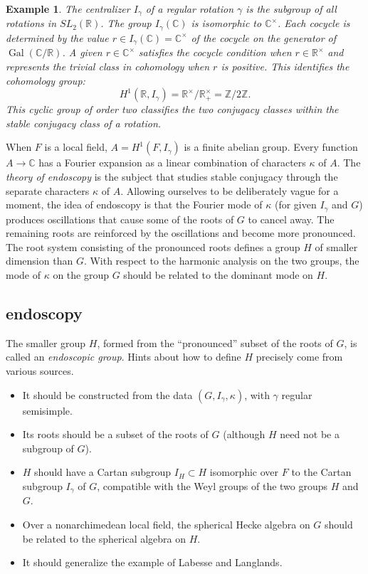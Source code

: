 \documentclass[brochure,english,12pt]{bourbaki}
\theoremstyle{plain}
\newtheorem{example}[equation]{Example}
\def\op#1{{\operatorname{#1}}}
\newcommand{\ring}[1]{\mathbb{#1}}
\begin{document}
\begin{example} The centralizer $I_\gamma$ of a regular rotation
  $\gamma$ is the subgroup of all rotations in $SL_2(\ring{R})$.  The
  group $I_\gamma(\ring{C})$ is isomorphic to $\ring{C}^\times$.  Each
  cocycle is determined by the value $r\in
  I_\gamma(\ring{C})=\ring{C}^\times$ of the cocycle on the generator of
  $\op{Gal}(\ring{C}/\ring{R})$.  A given $r\in\ring{C}^\times$
  satisfies the cocycle condition when $r\in \ring{R}^\times$ and
  represents the trivial class in cohomology when $r$ is positive.
  This identifies the cohomology group:
\[
H^1(\ring{R},I_\gamma) = \ring{R}^\times/\ring{R}^\times_+ = \ring{Z}/2\ring{Z}.
\]
This cyclic group of order two classifies the two conjugacy classes
within the stable conjugacy class of a rotation.
\end{example}

When $F$ is a local field, $A=H^1(F,I_\gamma)$ is a
finite abelian group.  Every function $A\to\ring{C}$  has a
Fourier expansion as a linear combination of characters $\kappa$ of
$A$.  
The {\it theory of endoscopy} is the subject that studies stable
conjugacy through the separate characters $\kappa$ of $A$.  Allowing
ourselves to be deliberately vague for a moment, the idea of endoscopy
is that the Fourier mode of $\kappa$ (for given $I_\gamma$ and $G$)
produces oscillations that cause some of the roots of $G$ to cancel
away.  The remaining roots are reinforced by the oscillations and
become more pronounced.  The root system consisting of the pronounced
roots defines a group $H$ of smaller dimension than $G$.  With respect
to the harmonic analysis on the two groups, the mode of $\kappa$ on
the group $G$ should be related to the dominant mode on $H$.




\subsection{endoscopy}\label{sec:endoscopy}

The smaller group $H$, formed from the ``pronounced'' subset of the
roots of $G$, is called an {\it endoscopic group}.  Hints about how to
define $H$ precisely come from various sources.
\begin{itemize}
\item It should be constructed from the data $(G,I_\gamma,\kappa)$, with $\gamma$ regular semisimple.
\item Its roots should be a subset of the roots of $G$ (although $H$ need not
be a subgroup of $G$).
\item $H$ should have a Cartan subgroup $I_H\subset H$ isomorphic over $F$ to the Cartan subgroup
$I_\gamma$ of $G$, compatible with the Weyl groups of the two groups $H$ and $G$.
\item Over a nonarchimedean local field, the spherical Hecke algebra on $G$ should be related to the
spherical algebra on $H$.
\item It should generalize the example of Labesse and Langlands.
\end{itemize}
\end{document}
